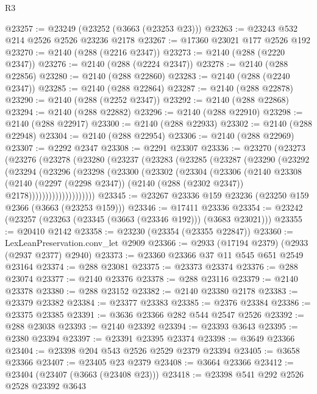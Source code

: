 \begin{lexlean}{R3}
\begin{coremodule}
@23257 := @23249 (@23252 (@3663 (@23253 @23)))
@23263 := @23243 @532 @214 @2526 @2526 @23236 @2178
@23267 := @17360 @23021 @177 @2526 @192
@23270 := @2140 (@288 (@2216 @2347))
@23273 := @2140 (@288 (@2220 @2347))
@23276 := @2140 (@288 (@2224 @2347))
@23278 := @2140 (@288 @22856)
@23280 := @2140 (@288 @22860)
@23283 := @2140 (@288 (@2240 @2347))
@23285 := @2140 (@288 @22864)
@23287 := @2140 (@288 @22878)
@23290 := @2140 (@288 (@2252 @2347))
@23292 := @2140 (@288 @22868)
@23294 := @2140 (@288 @22882)
@23296 := @2140 (@288 @22910)
@23298 := @2140 (@288 @22917)
@23300 := @2140 (@288 @22933)
@23302 := @2140 (@288 @22948)
@23304 := @2140 (@288 @22954)
@23306 := @2140 (@288 @22969)
@23307 := @2292 @2347
@23308 := @2291 @23307
@23336 := @23270
    (@23273
      (@23276
        (@23278
          (@23280
            (@23237
              (@23283
                (@23285
                  (@23287
                    (@23290
                      (@23292
                        (@23294
                          (@23296
                            (@23298
                              (@23300
                                (@23302
                                  (@23304
                                    (@23306
                                      (@2140
                                        @23308
                                        (@2140
                                          (@2297 (@2298 @2347))
                                          (@2140 (@288 (@2302 @2347)) @2178))))))))))))))))))))
@23345 := @23267 @23336 @159 @23236 (@23250 @159 @2366 (@3663 (@23253 @159)))
@23346 := @17411 @23336
@23354 := @23242 (@23257 (@23263 (@23345 (@3663 (@23346 @192))) (@3683 @23021)))
@23355 := @20410 @2142
@23358 := @23230 (@23354 (@23355 @22847))
@23360 := LexLeanPreservation.conv_let @2909
@23366 := @2933 (@17194 @2379) (@2933 (@2937 @2377) @2940)
@23373 := @23360 @23366 @37 @11 @545 @651 @2549 @23164
@23374 := @288 @23081
@23375 := @23373 @23374
@23376 := @288 @23074
@23377 := @2140 @23376
@23378 := @288 @23116
@23379 := @2140 @23378
@23380 := @288 @23152
@23382 := @2140 @23380 @2178
@23383 := @23379 @23382
@23384 := @23377 @23383
@23385 := @2376 @23384
@23386 := @23375 @23385
@23391 := @3636 @23366 @282 @544 @2547 @2526
@23392 := @288 @23038
@23393 := @2140 @23392
@23394 := @23393 @3643
@23395 := @2380 @23394
@23397 := @23391 @23395 @23374
@23398 := @3649 @23366
@23404 := @23398 @204 @543 @2526 @2529 @2379 @23394
@23405 := @3658 @23366
@23407 := @23405 @23 @2379
@23408 := @3664 @23366
@23412 := @23404 (@23407 (@3663 (@23408 @23)))
@23418 := @23398 @541 @292 @2526 @2528 @23392 @3643

\end{coremodule}
\end{lexlean}
